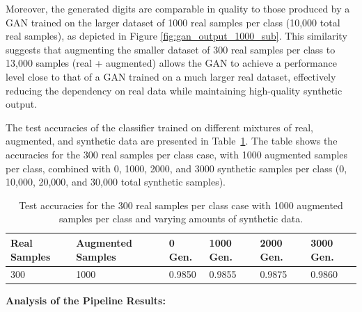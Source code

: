 \documentclass[12pt]{article}
\begin{document}
Moreover, the generated digits are comparable in quality to those produced by a GAN trained on the larger dataset of 1000 real samples per class (10,000 total real samples), as depicted in Figure \ref{fig:gan_output_1000_sub}. This similarity suggests that augmenting the smaller dataset of 300 real samples per class to 13,000 samples (real + augmented) allows the GAN to achieve a performance level close to that of a GAN trained on a much larger real dataset, effectively reducing the dependency on real data while maintaining high-quality synthetic output.

The test accuracies of the classifier trained on different mixtures of real, augmented, and synthetic data are presented in Table~\ref{tab:pipeline_results}. The table shows the accuracies for the 300 real samples per class case, with 1000 augmented samples per class, combined with 0, 1000, 2000, and 3000 synthetic samples per class (0, 10,000, 20,000, and 30,000 total synthetic samples).

\begin{table}[h]
\centering
\caption{Test accuracies for the 300 real samples per class case with 1000 augmented samples per class and varying amounts of synthetic data.}
\label{tab:pipeline_results}
\small
\begin{tabular}{|p{1.5cm}|p{2cm}|p{1.5cm}|p{1.5cm}|p{1.5cm}|p{1.5cm}|}
\hline
\textbf{Real Samples} & \textbf{Augmented Samples} & \textbf{0 Gen.} & \textbf{1000 Gen.} & \textbf{2000 Gen.} & \textbf{3000 Gen.} \\
\hline
300 & 1000 & 0.9850 & 0.9855 & 0.9875 & 0.9860 \\
\hline
\end{tabular}
\end{table}

\textbf{Analysis of the Pipeline Results:}
\end{document}
